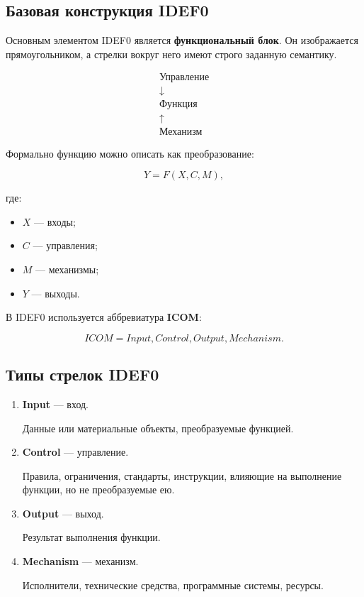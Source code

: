 \documentclass[12pt,a4paper]{article}
\theoremstyle{remark}
\begin{document}
\subsection{Базовая конструкция IDEF0}

Основным элементом IDEF0 является \textbf{функциональный блок}. Он изображается прямоугольником, а стрелки вокруг него имеют строго заданную семантику.

\[
\begin{array}{c}
    \text{Управление} \\
    \downarrow \\
    \boxed{\text{Функция}} \\
    \uparrow \\
    \text{Механизм}
\end{array}
\]

Формально функцию можно описать как преобразование:

\[
    Y = F(X, C, M),
\]

где:

\begin{itemize}
    \item $X$ --- входы;
    \item $C$ --- управления;
    \item $M$ --- механизмы;
    \item $Y$ --- выходы.
\end{itemize}

В IDEF0 используется аббревиатура \textbf{ICOM}:

\[
    ICOM = Input, Control, Output, Mechanism.
\]

\subsection{Типы стрелок IDEF0}

\begin{enumerate}
    \item \textbf{Input} --- вход.

    Данные или материальные объекты, преобразуемые функцией.

    \item \textbf{Control} --- управление.

    Правила, ограничения, стандарты, инструкции, влияющие на выполнение функции, но не преобразуемые ею.

    \item \textbf{Output} --- выход.

    Результат выполнения функции.

    \item \textbf{Mechanism} --- механизм.

    Исполнители, технические средства, программные системы, ресурсы.
\end{enumerate}
\end{document}
